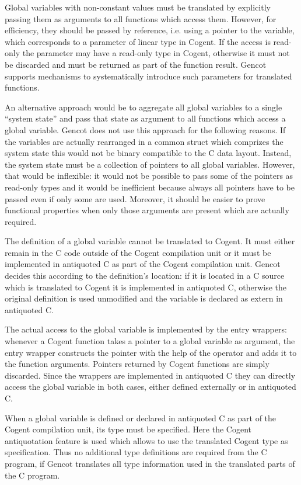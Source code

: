 Global variables with non-constant values must be translated by explicitly passing them as arguments to all functions which
access them. However, for efficiency, they should be passed by reference, i.e. using a pointer to the variable, which 
corresponds to a parameter of linear type in Cogent. If the access is read-only the parameter may have a read-only type in 
Cogent, otherwise it must not be discarded and must be returned as part of the function result. Gencot supports mechanisms
to systematically introduce such parameters for translated functions.

An alternative approach would be to aggregate all global variables to a single ``system state'' and pass that state as argument
to all functions which access a global variable. Gencot does not use this approach for the following reasons. If the variables
are actually rearranged in a common struct which comprizes the system state this would not be binary compatible to the C
data layout. Instead, the system state must be a collection of pointers to all global variables. However, that would be
inflexible: it would not be possible to pass some of the pointers as read-only types and it would be inefficient because always
all pointers have to be passed even if only some are used. Moreover, it should be easier to prove functional properties 
when only those arguments are present which are actually required.

The definition of a global variable cannot be translated to Cogent. It must either remain in the C code outside of the Cogent
compilation unit or it must be implemented in antiquoted C as part of the Cogent compilation unit. Gencot decides this according
to the definition's location: if it is located in a C source which is translated to Cogent it is implemented in antiquoted 
C, otherwise the original definition is used unmodified and the variable is declared as extern in antiquoted C.

The actual access to the global variable is implemented by the entry wrappers: whenever a Cogent function takes a pointer to
a global variable as argument, the entry wrapper constructs the pointer with the help of the \code{\&} operator and adds it
to the function arguments. Pointers returned by Cogent functions are simply discarded. Since the wrappers are implemented in 
antiquoted C they can directly access the global variable in both cases, either defined externally or in antiquoted C.

When a global variable is defined or declared in antiquoted C as part of the Cogent compilation unit, its type must be specified. 
Here the Cogent antiquotation feature is used which allows to use the translated Cogent type as specification. Thus no additional 
type definitions are required from the C program, if Gencot translates all type information used in the translated parts of
the C program.

